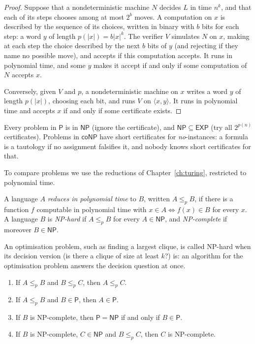 \begin{proof}
Suppose that a nondeterministic machine $N$ decides $L$ in time $n^k$, and that each of its steps chooses among at most $2^b$ moves. A computation on $x$ is described by the sequence of its choices, written in binary with $b$ bits for each step: a word $y$ of length $p(|x|)=b|x|^k$. The verifier $V$ simulates $N$ on $x$, making at each step the choice described by the next $b$ bits of $y$ (and rejecting if they name no possible move), and accepts if this computation accepts. It runs in polynomial time, and some $y$ makes it accept if and only if some computation of $N$ accepts $x$.

Conversely, given $V$ and $p$, a nondeterministic machine on $x$ writes a word $y$ of length $p(|x|)$, choosing each bit, and runs $V$ on $\langle x,y\rangle$. It runs in polynomial time and accepts $x$ if and only if some certificate exists.
\end{proof}

Every problem in $\mathsf P$ is in $\mathsf{NP}$ (ignore the certificate), and $\mathsf{NP}\subseteq\mathsf{EXP}$ (try all $2^{p(n)}$ certificates). Problems in $\mathsf{coNP}$ have short certificates for \emph{no}-instances: a formula is a tautology if no assignment falsifies it, and nobody knows short certificates for that.

To compare problems we use the reductions of Chapter~\ref{ch:turing}, restricted to polynomial time.

\begin{definition}\label{def:polyreduction}
A language $A$ \emph{reduces in polynomial time} to $B$, written $A\le_pB$, if there is a function $f$ computable in polynomial time with $x\in A\iff f(x)\in B$ for every $x$. A language $B$ is \emph{NP-hard} if $A\le_pB$ for every $A\in\mathsf{NP}$, and \emph{NP-complete} if moreover $B\in\mathsf{NP}$.
\end{definition}

An optimisation problem, such as finding a largest clique, is called NP-hard when its decision version (is there a clique of size at least $k$?) is: an algorithm for the optimisation problem answers the decision question at once.

\begin{proposition}\label{prop:reductions}
\begin{enumerate}
\item If $A\le_pB$ and $B\le_pC$, then $A\le_pC$.
\item If $A\le_pB$ and $B\in\mathsf P$, then $A\in\mathsf P$.
\item If $B$ is NP-complete, then $\mathsf P=\mathsf{NP}$ if and only if $B\in\mathsf P$.
\item If $B$ is NP-complete, $C\in\mathsf{NP}$ and $B\le_pC$, then $C$ is NP-complete.
\end{enumerate}
\end{proposition}

